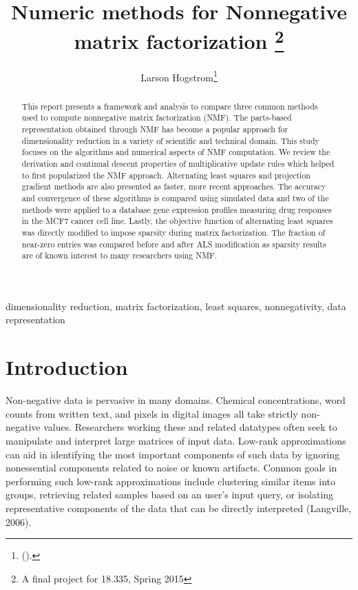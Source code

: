 \documentclass[final,leqno,onefignum,onetabnum]{siamltex1213}
\title{Numeric methods for Nonnegative matrix factorization \thanks{A final project for 18.335, Spring 2015}}
\author{Larson Hogstrom\thanks{
(\email{hogstrom@mit.edu}). }}
\begin{document}
\maketitle
{}%

\begin{abstract}
This report presents a framework and analysis to compare three common methods used to compute nonnegative matrix factorization (NMF). The parts-based representation obtained through NMF has become a popular approach for dimensionality reduction in a variety of scientific and technical domain. This study focuses on the algorithms and numerical aspects of NMF computation. We review the derivation and continual descent properties of multiplicative update rules which helped to first popularized the NMF approach. Alternating least squares and projection gradient methods are also presented as faster, more recent approaches. The accuracy and convergence of these algorithms is compared using simulated data and two of the methods were applied to a database gene expression profiles measuring drug responses in the MCF7 cancer cell line. Lastly, the objective function of alternating least squares was directly modified to impose sparsity during matrix factorization. The fraction of near-zero entries was compared before and after ALS modification as sparsity results are of known interest to many researchers using NMF. 
\end{abstract}

\begin{keywords} dimensionality reduction, matrix factorization, least squares, nonnegativity, data representation \end{keywords}



\pagestyle{myheadings}
\thispagestyle{plain}

\section{Introduction}

Non-negative data is pervasive in many domains. Chemical concentrations, word counts from written text, and pixels in digital images all take strictly non-negative values. Researchers working these and related datatypes often seek to manipulate and interpret large matrices of input data. Low-rank approximations can aid in identifying the most important components of such data by ignoring nonessential components related to noise or known artifacts. Common goals in performing such low-rank approximations include clustering similar items into groups, retrieving related samples based on an user's input query, or isolating representative components of the data that can be directly interpreted (Langville, 2006).  
\end{document}
